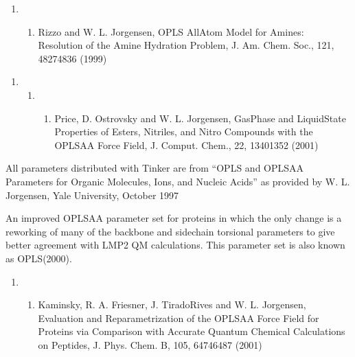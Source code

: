\documentclass[letterpaper,11pt,english]{sphinxmanual}
\begin{document}
\begin{enumerate}
%
\setcounter{enumi}{17}
\item {} \begin{enumerate}
%
\setcounter{enumii}{2}
\item {} 
Rizzo and W. L. Jorgensen, OPLS All\sphinxhyphen{}Atom Model for Amines: Resolution of the Amine Hydration Problem, J. Am. Chem. Soc., 121, 4827\sphinxhyphen{}4836 (1999)

\end{enumerate}

\end{enumerate}
\begin{enumerate}
%
\setcounter{enumi}{12}
\item {} \begin{enumerate}
%
\setcounter{enumii}{11}
\item {} \begin{enumerate}
%
\setcounter{enumiii}{15}
\item {} 
Price, D. Ostrovsky and W. L. Jorgensen, Gas\sphinxhyphen{}Phase and Liquid\sphinxhyphen{}State Properties of Esters, Nitriles, and Nitro Compounds with the OPLS\sphinxhyphen{}AA Force Field, J. Comput. Chem., 22, 1340\sphinxhyphen{}1352 (2001)

\end{enumerate}

\end{enumerate}

\end{enumerate}

All parameters distributed with Tinker are from “OPLS and OPLS\sphinxhyphen{}AA Parameters for Organic Molecules, Ions, and Nucleic Acids” as provided by W. L. Jorgensen, Yale University, October 1997


An improved OPLS\sphinxhyphen{}AA parameter set for proteins in which the only change is a reworking of many of the backbone and sidechain torsional parameters to give better agreement with LMP2 QM calculations. This parameter set is also known as OPLS(2000).
\begin{enumerate}
%
\setcounter{enumi}{6}
\item {} \begin{enumerate}
%
\item {} 
Kaminsky, R. A. Friesner, J. Tirado\sphinxhyphen{}Rives and W. L. Jorgensen, Evaluation and Reparametrization of the OPLS\sphinxhyphen{}AA Force Field for Proteins via Comparison with Accurate Quantum Chemical Calculations on Peptides, J. Phys. Chem. B, 105, 6474\sphinxhyphen{}6487 (2001)

\end{enumerate}

\end{enumerate}
\end{document}
